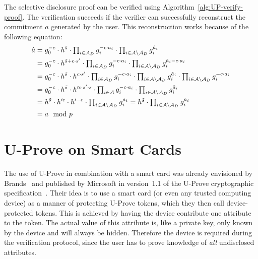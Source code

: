 The selective disclosure proof can be verified using
Algorithm~\ref{alg:UP-verify-proof}. The verification succeeds if the verifier
can successfully reconstruct the commitment $a$ generated by the user. This
reconstruction works because of the following equation:
\begin{align*}
  \hat{a}
  & = g_0^{-c} \cdot h^{\hat{s}}
    \cdot \textstyle\prod_{i \in \mathcal{A}_D} g_i^{-c \cdot a_i}
    \cdot \textstyle\prod_{i \in \mathcal{A} \setminus \mathcal{A}_D} g_i^{\hat{a}_i} \\
  & = g_0^{-c} \cdot h^{\tilde{s} + c \cdot s'}
    \cdot \textstyle\prod_{i \in \mathcal{A}_D} g_i^{-c \cdot a_i}
    \cdot \textstyle\prod_{i \in \mathcal{A} \setminus \mathcal{A}_D} g_i^{\tilde{a}_i - c \cdot a_i} \\
  & = g_0^{-c} \cdot h^{\tilde{s}} \cdot h^{c \cdot s'}
    \cdot \textstyle\prod_{i \in \mathcal{A}_D} g_i^{-c \cdot a_i}
    \cdot \textstyle\prod_{i \in \mathcal{A} \setminus \mathcal{A}_D} g_i^{\tilde{a}_i}
    \cdot \textstyle\prod_{i \in \mathcal{A} \setminus \mathcal{A}_D} g_i^{- c \cdot a_i} \\
  & = g_0^{-c} \cdot h^{\tilde{s}} \cdot h'^{c \cdot s' \cdot s}
    \cdot \textstyle\prod_{i \in \mathcal{A}} g_i^{-c \cdot a_i}
    \cdot \textstyle\prod_{i \in \mathcal{A} \setminus \mathcal{A}_D} g_i^{\tilde{a}_i} \\
  & = h^{\tilde{s}} \cdot h'^{c} \cdot h'^{-c}
    \cdot \textstyle\prod_{i \in \mathcal{A} \setminus \mathcal{A}_D} g_i^{\tilde{a}_i}
  = h^{\tilde{s}}
    \cdot \textstyle\prod_{i \in \mathcal{A} \setminus \mathcal{A}_D} g_i^{\tilde{a}_i} \\
  & = a \mod p
\end{align*}


\section{U-Prove on Smart Cards}\label{sec:UP-smartcard}

The use of U-Prove in combination with a smart card was already envisioned by
Brands~\cite{Brands2000} and published by Microsoft in version~1.1 of the
U-Prove cryptographic specification~\cite{U-Prove_Crypto2011}. Their idea is to
use a smart card (or even any trusted computing device) as a manner of
protecting U-Prove tokens, which they then call device-protected tokens. This is
achieved by having the device contribute one attribute to the token. The actual
value of this attribute is, like a private key, only known by the device and
will always be hidden. Therefore the device is required during the verification
protocol, since the user has to prove knowledge of \emph{all} undisclosed
attributes.

